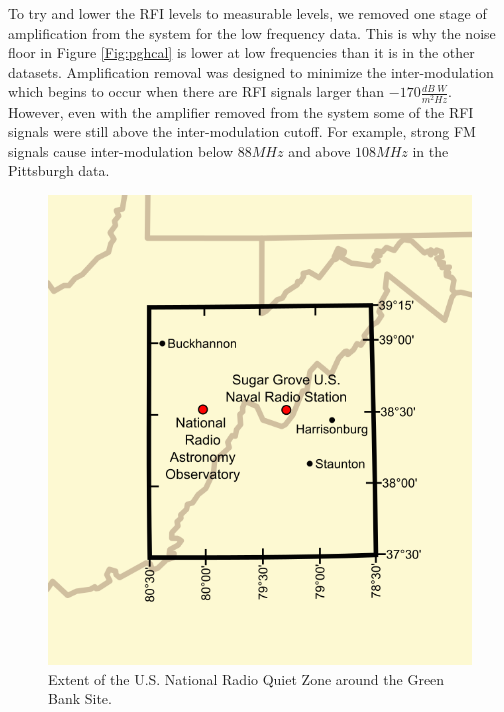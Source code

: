 To try and lower the RFI levels to measurable levels, we removed one stage of amplification from the system for the low frequency data. This is why the noise floor in Figure \ref{Fig:pghcal} is lower at low frequencies than it is in the other datasets. Amplification removal was designed to minimize the inter-modulation which begins to occur when there are RFI signals larger than $-170 \frac{dB \;W}{m^2 Hz}$. However, even with the amplifier removed from the system some of the RFI signals were still above the inter-modulation cutoff. For example, strong FM signals cause inter-modulation below $88 MHz$ and above $108 MHz$ in the Pittsburgh data. 


\begin{figure}[htb]
\centering
\begin{minipage}[b]{0.47\textwidth}
\centering
\includegraphics[width=0.75\linewidth]{RFI_testing/figures/National_Radio_Quiet_Zone.png}
\caption{Extent of the U.S. National Radio Quiet Zone around the Green Bank Site.}
\label{Fig:nrqz}
\end{minipage}%
\begin{minipage}[b]{0.02\textwidth}
\hspace{1cm}
\end{minipage}%
\begin{minipage}[b]{0.47\textwidth}
\centering

\end{minipage}
\end{figure}
